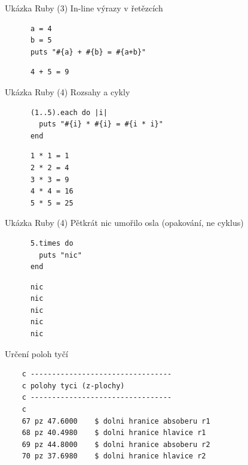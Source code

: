 \documentclass{beamer}
\begin{document}
\begin{frame}[fragile]{Ukázka Ruby (3)}
  In-line výrazy v řetězcích
  \begin{block}{}
    \smallskip \footnotesize
    \begin{verbatim}
      a = 4
      b = 5
      puts "#{a} + #{b} = #{a+b}"
    \end{verbatim}    
  \end{block}
  \pause
  \begin{block}{}
    \smallskip \footnotesize
    \begin{verbatim}
      4 + 5 = 9
    \end{verbatim}
  \end{block}
\end{frame}

\begin{frame}[fragile]{Ukázka Ruby (4)}
  Rozsahy a cykly
  \begin{block}{}
    \smallskip \footnotesize
    \begin{verbatim}
      (1..5).each do |i|
        puts "#{i} * #{i} = #{i * i}"
      end
    \end{verbatim}    
  \end{block}
  \pause
  \begin{block}{}
    \smallskip \footnotesize
    \begin{verbatim}
      1 * 1 = 1
      2 * 2 = 4
      3 * 3 = 9
      4 * 4 = 16
      5 * 5 = 25
    \end{verbatim}
  \end{block}
\end{frame}


\begin{frame}[fragile]{Ukázka Ruby (4)}
  Pětkrát nic umořilo osla (opakování, ne cyklus)
  \begin{block}{}
    \smallskip \footnotesize
    \begin{verbatim}
      5.times do
        puts "nic"
      end
    \end{verbatim}    
  \end{block}
  \pause
  \begin{block}{}
    \smallskip \footnotesize
    \begin{verbatim}
      nic
      nic
      nic
      nic
      nic
    \end{verbatim}
  \end{block}
\end{frame}




\begin{frame}[fragile]{Určení poloh tyčí}
  \tiny
  \begin{verbatim}
    c ---------------------------------
    c polohy tyci (z-plochy)
    c ---------------------------------
    c
    67 pz 47.6000    $ dolni hranice absoberu r1
    68 pz 40.4980    $ dolni hranice hlavice r1
    69 pz 44.8000    $ dolni hranice absoberu r2
    70 pz 37.6980    $ dolni hranice hlavice r2
  \end{verbatim}
\end{frame}
\end{document}
